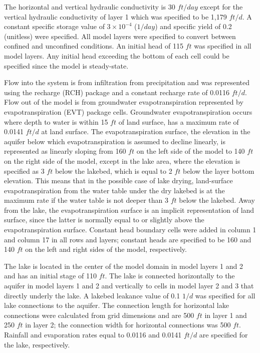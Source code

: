 

The horizontal and vertical hydraulic conductivity is 30 $ft/day$ except for the vertical hydraulic conductivity of layer 1 which was specified to be 1,179 $ft/d$. A constant specific storage value of $3 \times 10^{-4}$ ($1/day$) and specific yield of 0.2 (unitless) were specified. All model layers were specified to convert between confined and unconfined conditions. An initial head of 115 $ft$ was specified in all model layers. Any initial head exceeding the bottom of each cell could be specified since the model is steady-state.

Flow into the system is from infiltration from precipitation and was represented using the recharge (RCH) package and a constant recharge rate of 0.0116 $ft/d$. Flow out of the model is from groundwater evapotranspiration represented by evapotranspiration (EVT) package cells. Groundwater evapotranspiration occurs where depth to water is within 15 $ft$ of land surface, has a maximum rate of 0.0141 $ft/d$ at land surface. The evapotranspiration surface, the elevation in the aquifer below which evapotranspiration is assumed to decline linearly, is represented as linearly sloping from 160 $ft$ on the left side of the model to 140 $ft$ on the right side of the model, except in the lake area, where the elevation is specified as 3 $ft$ below the lakebed, which is equal to 2 $ft$ below the layer bottom elevation. This means that in the possible case of lake drying, land-surface evapotranspiration from the water table under the dry lakebed is at the maximum rate if the water table is not deeper than 3 $ft$ below the lakebed. Away from the lake, the evapotranspiration surface is an implicit representation of land surface, since the latter is normally equal to or slightly above the evapotranspiration surface. Constant head boundary cells were added in column 1 and column 17 in all rows and layers; constant heads are specified to be 160 and 140 $ft$ on the left and right sides of the model, respectively.

The lake is located in the center of the model domain in model layers 1 and 2 and has an initial stage of 110 $ft$. The lake is connected horizontally to the aquifer in model layers 1 and 2 and vertically to cells in model layer 2 and 3 that directly underly the lake. A lakebed leakance value of 0.1 $1/d$ was specified for all lake connections to the aquifer. The connection length for horizontal lake connections were calculated from grid dimensions and are 500 $ft$ in layer 1 and 250 $ft$ in layer 2; the connection width for horizontal connections was 500 $ft$. Rainfall and evaporation rates equal to 0.0116 and 0.0141 $ft/d$ are specified for the lake, respectively.

